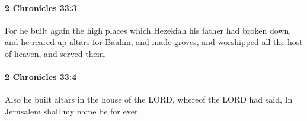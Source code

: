 		\paragraph{2 Chronicles 33:3} %
			\label{2CHRONICLES-33-3}

			For he built again the high places which Hezekiah his father had broken down, and he reared up altars for Baalim, and made groves, and worshipped all the host of heaven, and served them.


		\paragraph{2 Chronicles 33:4} %
			\label{2CHRONICLES-33-4}

			Also he built altars in the house of the LORD, whereof the LORD had said, In Jerusalem shall my name be for ever.


